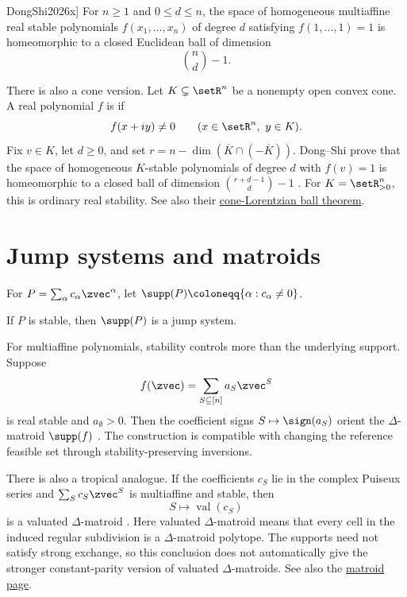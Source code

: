 \begin{theorem}[Dong--Shi, \cite[Thm.~1.3]{DongShi2026x}]
For $n\geq1$ and $0\leq d\leq n$, the space of homogeneous multiaffine
real stable polynomials $f(x_1,\dotsc,x_n)$ of degree $d$ satisfying
$f(1,\dotsc,1)=1$ is homeomorphic to a closed Euclidean ball of dimension
\[
 \binom nd-1.
\]
\end{theorem}

There is also a cone version. Let $K\subsetneq\setR^n$ be a nonempty
open convex cone. A real polynomial $f$ is
\label{coneStablePolynomial} if
\[
 f(x+iy)\ne0\qquad(x\in\setR^n,\ y\in K).
\]
Fix $v\in K$, let $d\geq0$, and set
$r=n-\dim(\overline K\cap(-\overline K))$.
Dong--Shi prove that the space of homogeneous $K$-stable polynomials of
degree $d$ with $f(v)=1$ is homeomorphic to a closed ball of dimension
$\binom{r+d-1}{d}-1$ \cite[Thm.~1.2]{DongShi2026x}.
For $K=\setR_{>0}^n$, this is ordinary real stability.
See also their \hyperref[lorentzianConeTopology]{cone-Lorentzian ball theorem}.

\section[stabilityConnections]{Jump systems and matroids}


For $P = \sum_{\alpha} c_\alpha \zvec^\alpha$, let
$\supp(P) \coloneqq \{\alpha : c_\alpha \neq 0\}$.

\begin{theorem}
If $P$ is stable, then $\supp(P)$ is a jump system.
\end{theorem}

For multiaffine polynomials, stability controls more than the underlying
support.  Suppose
\[
  f(\zvec)=\sum_{S\subseteq[n]}a_S\zvec^S
\]
is real stable and $a_\emptyset>0$.  Then the coefficient signs
$S\mapsto\sign(a_S)$ orient the $\Delta$-matroid $\supp(f)$
\cite[Thm.~3.1]{Chin2026x}.  The construction is compatible with changing the
reference feasible set through stability-preserving inversions.

There is also a tropical analogue.  If the coefficients $c_S$ lie in the
complex Puiseux series and $\sum_Sc_S\zvec^S$ is multiaffine and stable, then
\[
  S\longmapsto\operatorname{val}(c_S)
\]
is a valuated $\Delta$-matroid \cite[Thm.~4.1]{Chin2026x}.  Here valuated
$\Delta$-matroid means that every cell in the induced regular subdivision is
a $\Delta$-matroid polytope.  The supports need not satisfy strong exchange,
so this conclusion does not automatically give the stronger constant-parity
version of valuated $\Delta$-matroids.  See also the
\hyperref[deltaMatroid]{matroid page}.


